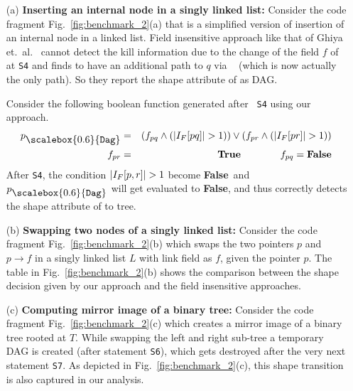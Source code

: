 \documentclass{sig-alternate}
\newcommand{\q}{\ensuremath{q}}
\newcommand{\subD}{\mbox{\scalebox{0.6}{\Dag}}}
\newcommand{\num}[1]{\ensuremath{|#1|}}
\newcommand{\Dag}{{\tt Dag}}
\newcommand{\false}{\textbf{False}}
\newcommand{\true}{\textbf{True}}
\begin{document}
\begin{itemize}
\item[(a)] {\bf Inserting an internal node in a singly linked
  list: }
Consider the code fragment Fig.~\ref{fig:benchmark_2}(a) that
is a simplified version of insertion of an internal node in a
linked list.  Field insensitive approach like that of Ghiya
et.~al.~\cite{Ghiya96} cannot detect the kill information due
to the change of the field $f$ of {\tt \on} at {\tt S4} and
finds {\tt \on} to have an additional path to $\q$ via {\tt
  \nn} (which is now actually the only path). So they report
the shape attribute of {\tt \on} as DAG.

Consider the following boolean function generated after {\tt
  S4} using our approach.
\begin{eqnarray*}
  \on_{\subD} &=&   (f_{\on\q} \wedge (\num{I_F[\on\q]} > 1)) 
  \vee  (f_{\on\nn} \wedge (\num{I_F[\on\nn]} > 1)) \\
  f_{\on\nn} &=& \true \qquad\qquad  f_{\on\q} = \false
\end{eqnarray*}
After {\tt S4}, the condition $\num{I_F[\on,\nn]} > 1$ become
\false\ and $\on_{\subD}$ will get evaluated to \false, and
thus correctly detects the shape attribute of {\tt \on} to
tree.
\item[(b)] {\bf Swapping two nodes of a singly linked list: }
Consider the code fragment Fig.~\ref{fig:benchmark_2}(b)
which swaps the two pointers $p$ and $p\rightarrow f$ in a
singly linked list $L$ with link field as $f$, given the
pointer $p$. The table in Fig.~\ref{fig:benchmark_2}(b) shows the
comparison between the shape decision given by our approach
and the field insensitive approaches.
\item [(c)]{\bf Computing mirror image of a  binary tree: }
Consider the code fragment Fig.~\ref{fig:benchmark_2}(c)
which creates a mirror image of a binary tree rooted at
$T$. While swapping the left and right sub-tree a temporary
DAG is created (after statement {\tt S6}), which gets
destroyed after the very next statement {\tt S7}. As depicted
in Fig.~\ref{fig:benchmark_2}(c), this shape transition is also
captured in our analysis.
\end{itemize}
\end{document}
